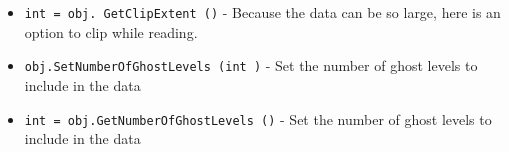 \begin{itemize}
\item  \verb|int = obj. GetClipExtent ()| -  Because the data can be so large, here is an option to clip
 while reading.

\item  \verb|obj.SetNumberOfGhostLevels (int )| -  Set the number of ghost levels to include in the data

\item  \verb|int = obj.GetNumberOfGhostLevels ()| -  Set the number of ghost levels to include in the data

\end{itemize}
